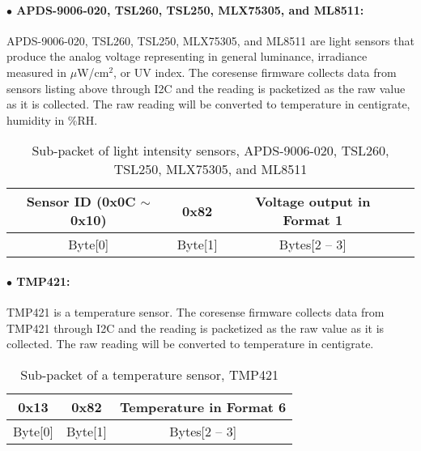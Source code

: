 \paragraph{$\bullet$ APDS-9006-020, TSL260, TSL250, MLX75305, and ML8511:}
APDS-9006-020, TSL260, TSL250, MLX75305, and ML8511 are light sensors that produce the analog voltage 
representing in general luminance, irradiance measured in $\mu$W/cm$^2$, or UV index. 
The coresense firmware collects data from sensors listing above through I2C and the reading is packetized as the raw value as it is collected.
The raw reading will be converted to temperature in centigrate, humidity in \%RH.

\begin{table}[h!]
    \centering
    \caption{Sub-packet of light intensity sensors, APDS-9006-020, TSL260, TSL250, MLX75305, and ML8511}
    \begin{tabular}{|c|c|c|c|}
        \hline
        \rowcolor{black!8}
        \textbf{Sensor ID} (0x0C $\sim$ 0x10) & \textbf{0x82} & \textbf{Voltage output in Format 1}\\
        \hline
        Byte[0] & Byte[1] & Bytes[2 -- 3] \\ \hline
    \end{tabular}
\end{table}


\paragraph{$\bullet$ TMP421:}
TMP421 is a temperature sensor.
The coresense firmware collects data from TMP421 through I2C and the reading is packetized as the raw value as it is collected.
The raw reading will be converted to temperature in centigrate.

\begin{table}[h!]
    \centering
    \caption{Sub-packet of a temperature sensor, TMP421}
    \begin{tabular}{|c|c|c|}
        \hline
        \rowcolor{black!8}
        \textbf{0x13} & \textbf{0x82} & \textbf{Temperature in Format 6}\\
        \hline
        Byte[0] & Byte[1] & Bytes[2 -- 3] \\ \hline
    \end{tabular}
\end{table}

